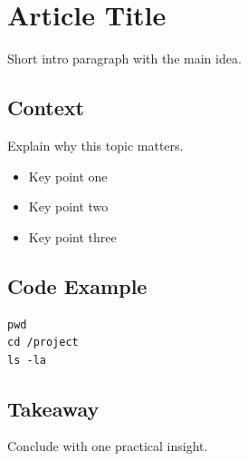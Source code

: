 \section{Article Title}

Short intro paragraph with the main idea.

\subsection{Context}

Explain why this topic matters.

\begin{itemize}
\item Key point one
\item Key point two
\item Key point three
\end{itemize}

\subsection{Code Example}

\begin{verbatim}
pwd
cd /project
ls -la
\end{verbatim}

\subsection{Takeaway}

Conclude with one practical insight.
